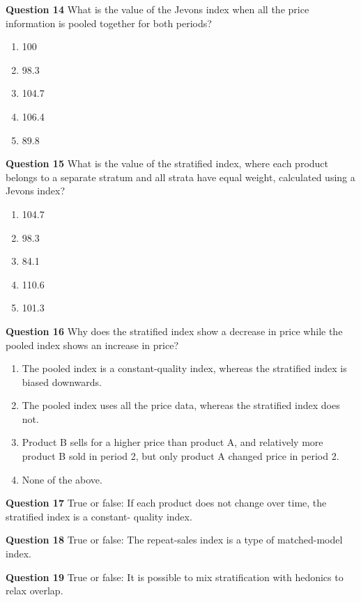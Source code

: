 \documentclass[
]{article}
\begin{document}
\textbf{Question 14} What is the value of the Jevons index when all the price information is pooled together for both periods?

\begin{enumerate}
\def\labelenumi{\alph{enumi})}
\item
  100
\item
  98.3
\item
  104.7
\item
  106.4
\item
  89.8
\end{enumerate}

\textbf{Question 15} What is the value of the stratified index, where each product belongs to a separate stratum and all strata have equal weight, calculated using a Jevons index?

\begin{enumerate}
\def\labelenumi{\alph{enumi})}
\item
  104.7
\item
  98.3
\item
  84.1
\item
  110.6
\item
  101.3
\end{enumerate}

\textbf{Question 16} Why does the stratified index show a decrease in price while the pooled index shows an increase in price?

\begin{enumerate}
\def\labelenumi{\alph{enumi})}
\item
  The pooled index is a constant-quality index, whereas the stratified index is biased
  downwards.
\item
  The pooled index uses all the price data, whereas the stratified index does not.
\item
  Product B sells for a higher price than product A, and relatively more product B
  sold in period 2, but only product A changed price in period 2.
\item
  None of the above.
\end{enumerate}

\textbf{Question 17} True or false: If each product does not change over time, the stratified index is a constant- quality index.

\textbf{Question 18} True or false: The repeat-sales index is a type of matched-model index.

\textbf{Question 19} True or false: It is possible to mix stratification with hedonics to relax overlap.
\end{document}

